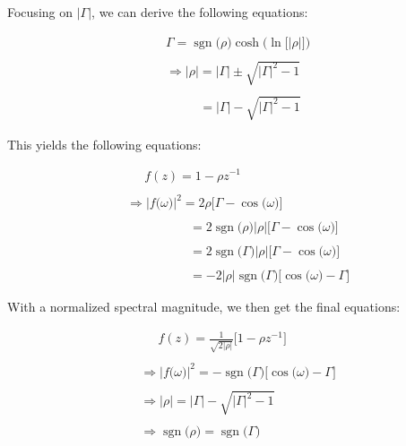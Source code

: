 \documentclass{article}
\DeclareMathOperator{\sgn}{sgn}
\begin{document}
Focusing on $\big|\Gamma\big|$, we can derive the following equations:

\begin{align*}
    & \Gamma = \sgn\big(\rho\big)\cosh\Big(\ln\big[\big|\rho\big|\big]\Big) \\ \\
    & \Rightarrow \big|\rho\big| = \big|\Gamma\big| \pm \sqrt{\big|\Gamma\big|^{2} - 1} \\ \\
    & \quad \quad \ \ \ = \big|\Gamma\big| - \sqrt{\big|\Gamma\big|^{2} - 1}
  \end{align*}

\newpage

This yields the following equations:

\begin{align*}
    & \quad \ \ f(z) = 1 - \rho z^{-1} \\ \\
    & \Rightarrow \Big|f\big(\omega\big)\Big|^{2} = 2\rho\bigg[\Gamma - \cos\big(\omega\big)\bigg] \\ \\
    & \quad \quad \quad \quad \quad = 2\sgn\big(\rho\big)\big|\rho\big|\bigg[\Gamma - \cos\big(\omega\big)\bigg] \\ \\
    & \quad \quad \quad \quad \quad = 2\sgn\big(\Gamma\big)\big|\rho\big|\bigg[\Gamma - \cos\big(\omega\big)\bigg] \\ \\
    & \quad \quad \quad \quad \quad = -2\big|\rho\big|\sgn\big(\Gamma\big)\bigg[\cos\big(\omega\big) - \Gamma\bigg]
  \end{align*}\newline

With a normalized spectral magnitude, we then get the final equations:

\begin{align*}
    & \quad \ \ f(z) = \frac{1}{\sqrt{2\big|\rho\big|}}\big[1 - \rho z^{-1}\big] \\ \\
    & \Rightarrow \Big|f\big(\omega\big)\Big|^{2} = -\sgn\big(\Gamma\big)\bigg[\cos\big(\omega\big) - \Gamma\bigg] \\ \\ 
    & \Rightarrow \big|\rho\big| = \big|\Gamma\big| - \sqrt{\big|\Gamma\big|^{2} - 1} \\ \\
    & \Rightarrow \sgn\big(\rho\big) = \sgn\big(\Gamma\big)
  \end{align*}
\end{document}
